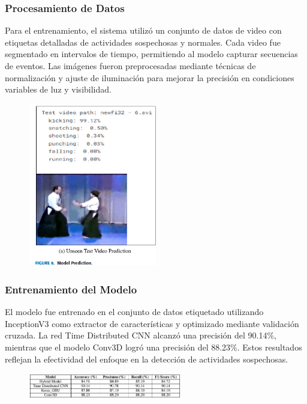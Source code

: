 \clearpage


\subsubsection{Procesamiento de Datos}
Para el entrenamiento, el sistema utilizó un conjunto de datos de video con etiquetas detalladas de actividades sospechosas y normales. Cada video fue segmentado en intervalos de tiempo, permitiendo al modelo capturar secuencias de eventos. Las imágenes fueron preprocesadas mediante técnicas de normalización y ajuste de iluminación para mejorar la precisión en condiciones variables de luz y visibilidad.

\begin{figure}[h] %
    \centering
    \includegraphics[width=0.5\textwidth]{4/pro7.png} %
    \label{fig:ejemplo} %
\end{figure}


\subsubsection{Entrenamiento del Modelo}
El modelo fue entrenado en el conjunto de datos etiquetado utilizando InceptionV3 como extractor de características y optimizado mediante validación cruzada. La red Time Distributed CNN alcanzó una precisión del 90.14\%, mientras que el modelo Conv3D logró una precisión del 88.23\%. Estos resultados reflejan la efectividad del enfoque en la detección de actividades sospechosas.

\begin{figure}[h] %
    \centering
    \includegraphics[width=0.6\textwidth]{4/ent7.png} %
    \label{fig:ejemplo} %
\end{figure}


